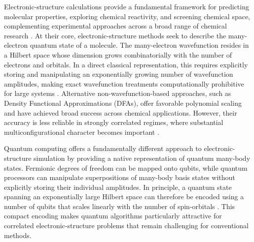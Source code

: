 Electronic-structure calculations provide a fundamental framework for predicting molecular properties, exploring chemical reactivity, and screening chemical space, complementing experimental approaches across a broad range of chemical research \cite{blum2024ESRoadmap,Marzari2021ESApplications,Burke2012DFTReview}. 
At their core, electronic-structure methods seek to describe the many-electron quantum state of a molecule.
The many-electron wavefunction resides in a Hilbert space whose dimension grows combinatorially with the number of electrons and orbitals. 
In a direct classical representation, this requires explicitly storing and manipulating an exponentially growing number of wavefunction amplitudes, making exact wavefunction treatments computationally prohibitive for large systems \cite{blum2024ESRoadmap, Graf2025QuantumChemistryScaling}. 
Alternative non-wavefunction-based approaches, such as Density Functional Approximations (DFAs), offer favorable polynomial scaling and have achieved broad success across chemical applications. 
However, their accuracy is less reliable in strongly correlated regimes, where substantial multiconfigurational character becomes important \cite{Burke2012DFTReview,Marzari2021ESApplications,Vuckovic2023DFTChallengesReview, Graf2025QuantumChemistryScaling}.

Quantum computing offers a fundamentally different approach to electronic-structure simulation by providing a native representation of quantum many-body states. 
Fermionic degrees of freedom can be mapped onto qubits, while quantum processors can manipulate superpositions of many-body basis states without explicitly storing their individual amplitudes. 
In principle, a quantum state spanning an exponentially large Hilbert space can therefore be encoded using a number of qubits that scales linearly with the number of spin-orbitals \cite{Schleich2025QuantumComputingForQuantumChemistry,McArdle2020QuantumComputingChemistryReview,Cao2019QCforQCReview}. 
This compact encoding makes quantum algorithms particularly attractive for correlated electronic-structure problems that remain challenging for conventional methods.

